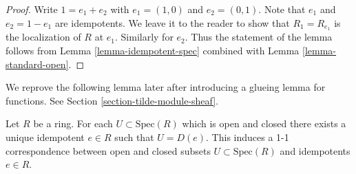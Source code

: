 \begin{proof}
Write $1 = e_1 + e_2$ with $e_1 = (1, 0)$ and $e_2 = (0, 1)$.
Note that $e_1$ and $e_2 = 1 - e_1$ are idempotents.
We leave it to the reader to show that
$R_1 = R_{e_1}$ is the localization of $R$ at $e_1$.
Similarly for $e_2$.
Thus the statement of the lemma follows from Lemma
\ref{lemma-idempotent-spec} combined with Lemma
\ref{lemma-standard-open}.
\end{proof}

\noindent
We reprove the following lemma later after introducing
a glueing lemma for functions. See Section
\ref{section-tilde-module-sheaf}.

\begin{lemma}
\label{lemma-disjoint-decomposition}
Let $R$ be a ring. For each $U \subset \text{Spec}(R)$
which is open and closed
there exists a unique idempotent $e \in R$ such that
$U = D(e)$. This induces a 1-1 correspondence between
open and closed subsets $U \subset \text{Spec}(R)$ and
idempotents $e \in R$.
\end{lemma}

